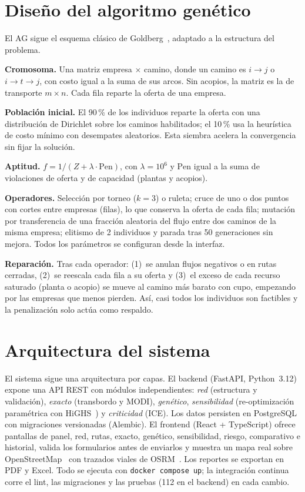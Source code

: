 \documentclass[conference]{IEEEtran}
\begin{document}
\section{Diseño del algoritmo genético}
El AG sigue el esquema clásico de Goldberg~\cite{goldberg}, adaptado a la estructura del problema.

\textbf{Cromosoma.} Una matriz empresa $\times$ camino, donde un camino es $i\to j$ o
$i\to t\to j$, con costo igual a la suma de sus arcos. Sin acopios, la matriz es la de transporte
$m\times n$. Cada fila reparte la oferta de una empresa.

\textbf{Población inicial.} El 90\,\% de los individuos reparte la oferta con una distribución de
Dirichlet sobre los caminos habilitados; el 10\,\% usa la heurística de costo mínimo con desempates
aleatorios. Esta siembra acelera la convergencia sin fijar la solución.

\textbf{Aptitud.} $f = 1/(Z + \lambda\cdot\mathrm{Pen})$, con $\lambda=10^6$ y $\mathrm{Pen}$ igual a
la suma de violaciones de oferta y de capacidad (plantas y acopios).

\textbf{Operadores.} Selección por torneo ($k=3$) o ruleta; cruce de uno o dos puntos con cortes
entre empresas (filas), lo que conserva la oferta de cada fila; mutación por transferencia de una
fracción aleatoria del flujo entre dos caminos de la misma empresa; elitismo de 2 individuos y parada
tras 50 generaciones sin mejora. Todos los parámetros se configuran desde la interfaz.

\textbf{Reparación.} Tras cada operador: (1)~se anulan flujos negativos o en rutas cerradas,
(2)~se reescala cada fila a su oferta y (3)~el exceso de cada recurso saturado (planta o acopio) se
mueve al camino más barato con cupo, empezando por las empresas que menos pierden. Así, casi todos los
individuos son factibles y la penalización solo actúa como respaldo.

\section{Arquitectura del sistema}
El sistema sigue una arquitectura por capas. El backend (FastAPI, Python~3.12) expone una API REST
con módulos independientes: \emph{red} (estructura y validación), \emph{exacto} (transbordo y MODI),
\emph{genético}, \emph{sensibilidad} (re-optimización paramétrica con HiGHS~\cite{highs}) y
\emph{criticidad} (ICE). Los datos persisten en PostgreSQL con migraciones versionadas (Alembic). El
frontend (React + TypeScript) ofrece pantallas de panel, red, rutas, exacto, genético, sensibilidad,
riesgo, comparativo e historial, valida los formularios antes de enviarlos y muestra un mapa real sobre
OpenStreetMap~\cite{osm} con trazados viales de OSRM~\cite{osrm}. Los reportes se exportan en PDF y
Excel. Todo se ejecuta con \texttt{docker compose up}; la integración continua corre el lint, las
migraciones y las pruebas (112 en el backend) en cada cambio.
\end{document}
